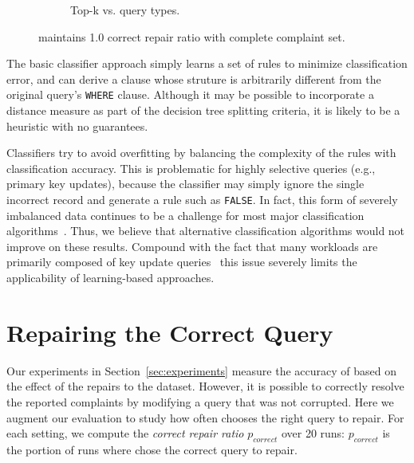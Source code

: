 \begin{description}[leftmargin=0mm, topsep=0mm, itemsep=0mm, parsep=1mm]
\begin{figure}[t]
\begin{subfigure} [t]{.3\textwidth}
    \vspace*{-.25in}
    \caption{Top-k vs. query types. }
    \vspace*{-.1in}
    \label{f:noiseratio} 
    \end{subfigure}
    \vspace{-2mm}
   \caption{ \sys maintains 1.0 correct repair ratio with complete complaint set. }
   \label{fig:truerate}
  \end{figure}
\item [Structurally Different \texttt{WHERE} Clause Results.] 
The basic classifier approach simply learns a set of rules to minimize
classification error, and can derive a clause whose struture is arbitrarily 
different from the original query's \texttt{WHERE} clause.
Although it may be possible to incorporate a distance measure as part of the decision tree
splitting criteria, it is likely to be a heuristic with no guarantees.


\item [High Selectivity, Low Precision.]
Classifiers try to avoid overfitting by balancing the complexity of the rules with classification accuracy.
This is problematic for highly selective queries (e.g., primary key updates), because the classifier
may simply ignore the single incorrect record and generate a rule such as \texttt{FALSE}.
In fact, this form of severely imbalanced data continues to be a challenge for most major classification algorithms~\cite{he2009learning, galar2012review}. 
Thus, we believe that alternative classification algorithms would not improve on these results. 
Compound with the fact that many workloads are primarily composed of
key update queries~\cite{oltpbench} this issue severely limits the
applicability of learning-based approaches.

\end{description}


\section{Repairing the Correct Query}
\label{app:index}


Our experiments in Section~\ref{sec:experiments} measure the accuracy of \sys
based on the effect of the repairs to the dataset. However, it is possible to
correctly resolve the reported complaints by modifying a query that was not
corrupted. Here we augment our evaluation to study how often \sys chooses the
right query to repair.  For each setting, we compute the \emph{correct repair
ratio} $p_{correct}$ over 20 runs: $p_{correct}$ is the portion of runs where \sys
chose the correct query to repair.

